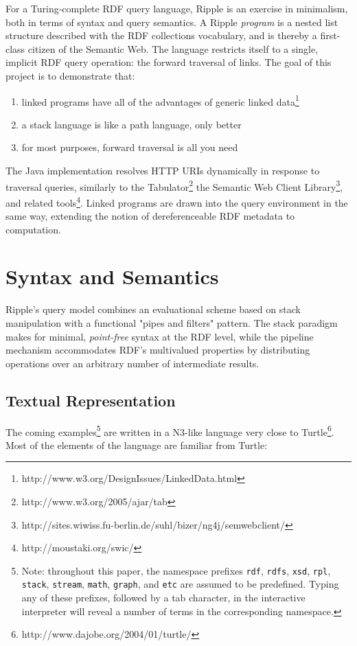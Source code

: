 \documentclass[runningheads]{llncs}
\begin{document}
For a Turing-complete RDF query language, Ripple is an exercise in minimalism, both in terms of syntax and query semantics.  A Ripple \textit{program} is a nested list structure described with the RDF collections vocabulary, and is thereby a first-class citizen of the Semantic Web.  The language restricts itself to a single, implicit RDF query operation: the forward traversal of links.  The goal of this project is to demonstrate that:
\begin{enumerate}
\item linked programs have all of the advantages of generic linked data\footnote{http://www.w3.org/DesignIssues/LinkedData.html}
\item a stack language is like a path language, only better
\item for most purposes, forward traversal is all you need
\end{enumerate}

The Java implementation resolves HTTP URIs dynamically in response to traversal queries, similarly to the Tabulator\footnote{http://www.w3.org/2005/ajar/tab} the Semantic Web Client Library\footnote{http://sites.wiwiss.fu-berlin.de/suhl/bizer/ng4j/semwebclient/}, and related tools\footnote{http://moustaki.org/swic/}.  Linked programs are drawn into the query environment in the same way, extending the notion of dereferenceable RDF metadata to computation.


\section{Syntax and Semantics}

Ripple's query model combines an evaluational scheme based on stack manipulation with a functional "pipes and filters" pattern.  The stack paradigm makes for minimal, \textit{point-free} syntax at the RDF level, while the pipeline mechanism accommodates RDF's multivalued properties by distributing operations over an arbitrary number of intermediate results.

\subsection{Textual Representation}
The coming examples\footnote{Note: throughout this paper, the namespace prefixes \texttt{rdf}, \texttt{rdfs}, \texttt{xsd}, \texttt{rpl}, \texttt{stack}, \texttt{stream}, \texttt{math}, \texttt{graph}, and \texttt{etc} are assumed to be predefined.  Typing any of these prefixes, followed by a tab character, in the interactive interpreter will reveal a number of terms in the corresponding namespace.} are written in a N3-like language very close to Turtle\footnote{http://www.dajobe.org/2004/01/turtle/}.  Most of the elements of the language are familiar from Turtle:
\newline
\end{document}
